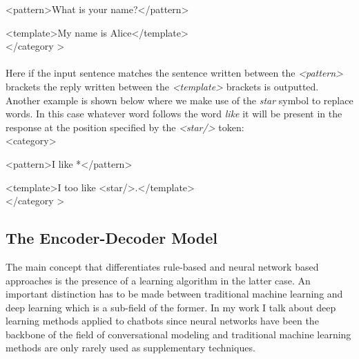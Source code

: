 \documentclass[12pt]{article}
\begin{document}
{\color{OliveGreen}\textless pattern\textgreater}What is your name?{\color{OliveGreen}\textless/pattern\textgreater}

{\color{OliveGreen}\textless template\textgreater}My name is Alice{\color{OliveGreen}\textless/template\textgreater}\\
{\color{OliveGreen}\textless/category \textgreater}\\
\\
Here if the input sentence matches the sentence written between the \textit{\textless pattern\textgreater} brackets the reply written between the \textit{\textless template\textgreater} brackets is outputted.\\
Another example is shown below where we make use of the \textit{star} symbol to replace words. In this case whatever word follows the word \textit{like} it will be present in the response at the position specified by the \textit{\textless star/\textgreater} token:\\
{\color{OliveGreen}\textless category\textgreater}

{\color{OliveGreen}\textless pattern\textgreater}I like *{\color{OliveGreen}\textless/pattern\textgreater}

{\color{OliveGreen}\textless template\textgreater}I too like {\color{OliveGreen}\textless star/\textgreater}.{\color{OliveGreen}\textless/template\textgreater}\\
{\color{OliveGreen}\textless/category \textgreater}\\

\subsection{The Encoder-Decoder Model} \label{ssec:23}
The main concept that differentiates rule-based and neural network based approaches is the presence of a learning algorithm in the latter case. An important distinction has to be made between traditional machine learning and deep learning which is a sub-field of the former. In my work I talk about deep learning methods applied to chatbots since neural networks have been the backbone of the field of conversational modeling and traditional machine learning methods are only rarely used as supplementary techniques.   
\end{document}
